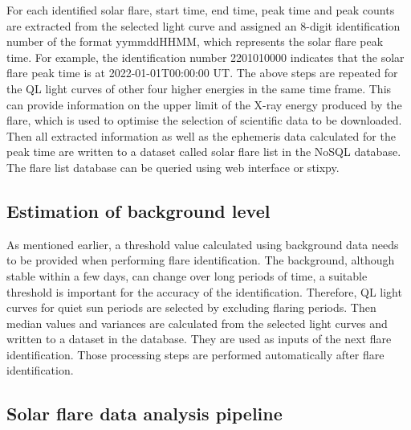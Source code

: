 \documentclass{aa}
\begin{document}
For each identified solar flare,  start time, end time, peak time and peak 
counts are extracted from the selected light curve and assigned 
an 8-digit identification number of the format yymmddHHMM, which represents the solar flare peak time. 
For example, the identification number 2201010000  indicates that 
the solar flare peak time is at 2022-01-01T00:00:00 UT. 
The above steps are repeated  for the QL light curves of other four higher energies
in the same time frame. This can provide information on the upper limit of the X-ray energy produced by the flare,
which is used to optimise the selection of scientific data to be downloaded. 
Then all extracted information as well as the ephemeris data calculated for the peak time are 
written to a dataset called solar flare list in the NoSQL database.
The flare list database can be queried using web interface or stixpy.
\subsection{Estimation of background level}
As mentioned earlier, a threshold value calculated using background data needs to be provided when
performing flare identification.  
The background, although stable within a few days, can change over long periods of time,
 a suitable threshold is important for the accuracy of the identification. 
 Therefore, QL light curves for  quiet sun periods are selected by excluding flaring periods. 
 Then median values and variances are calculated from the selected light curves and 
 written to a dataset in the database. They are used as inputs of the next flare identification. 
 Those processing steps are performed automatically after flare identification.

\subsection{Solar flare data analysis pipeline}
\end{document}
